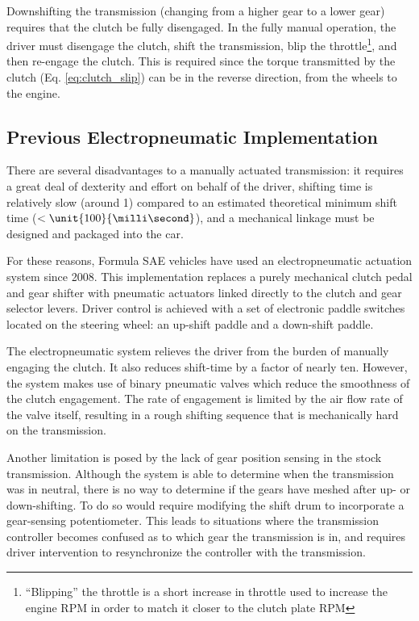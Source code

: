 Downshifting the transmission (changing from a higher gear to a lower gear) requires that the clutch be fully disengaged. In the fully manual operation, the driver must disengage the clutch, shift the transmission, blip the throttle\footnote{``Blipping'' the throttle is a short increase in throttle used to increase the engine RPM in order to match it closer to the clutch plate RPM}, and then re-engage the clutch. This is required since the torque transmitted by the clutch (Eq. \ref{eq:clutch_slip}) can be in the reverse direction, from the wheels to the engine.

\subsection{Previous Electropneumatic Implementation}

There are several disadvantages to a manually actuated transmission: it requires a great deal of dexterity and effort on behalf of the driver, shifting time is relatively slow (around \unit{1}{\second}) compared to an estimated theoretical minimum shift time ($<\unit{100}{\milli\second}$), and a mechanical linkage must be designed and packaged into the car.

For these reasons, Formula SAE vehicles have used an electropneumatic actuation system since 2008. This implementation replaces a purely mechanical clutch pedal and gear shifter with pneumatic actuators linked directly to the clutch and gear selector levers. Driver control is achieved with a set of electronic paddle switches located on the steering wheel: an up-shift paddle and a down-shift paddle.

The electropneumatic system relieves the driver from the burden of manually engaging the clutch. It also reduces shift-time by a factor of nearly ten. However, the system makes use of binary pneumatic valves which reduce the smoothness of the clutch engagement. The rate of engagement is limited by the air flow rate of the valve itself, resulting in a rough shifting sequence that is mechanically hard on the transmission. 

Another limitation is posed by the lack of gear position sensing in the stock transmission. Although the system is able to determine when the transmission was in neutral, there is no way to determine if the gears have meshed after up- or down-shifting. To do so would require modifying the shift drum to incorporate a gear-sensing potentiometer. This leads to situations where the transmission controller becomes confused as to which gear the transmission is in, and requires driver intervention to resynchronize the controller with the transmission.
